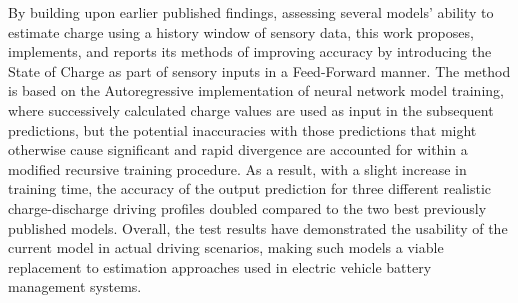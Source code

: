 {        By building upon earlier published findings, assessing several models' ability to estimate charge using a history window of sensory data, this work proposes, implements, and reports its methods of improving accuracy by introducing the State of Charge as part of sensory inputs in a Feed-Forward manner.
        The method is based on the Autoregressive implementation of neural network model training, where successively calculated charge values are used as input in the subsequent predictions, but the potential inaccuracies with those predictions that might otherwise cause significant and rapid divergence are accounted for within a modified recursive training procedure.
        As a result, with a slight increase in training time, the accuracy of the output prediction for three different realistic charge-discharge driving profiles doubled compared to the two best previously published models.
        Overall, the test results have demonstrated the usability of the current model in actual driving scenarios, making such models a viable replacement to estimation approaches used in electric vehicle battery management systems.
}
